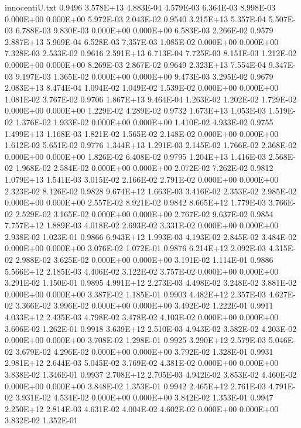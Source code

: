 \begin{filecontents}{innocentiU.txt}
0.9496 3.578E+13 4.883E-04 4.579E-03 6.364E-03 8.998E-03 0.000E+00 0.000E+00 5.972E-03 2.043E-02
0.9540 3.215E+13 5.357E-04 5.507E-03 6.788E-03 9.830E-03 0.000E+00 0.000E+00 6.583E-03 2.266E-02
0.9579 2.887E+13 5.969E-04 6.528E-03 7.357E-03 1.085E-02 0.000E+00 0.000E+00 7.328E-03 2.533E-02
0.9616 2.591E+13 6.713E-04 7.725E-03 8.151E-03 1.212E-02 0.000E+00 0.000E+00 8.269E-03 2.867E-02
0.9649 2.323E+13 7.554E-04 9.347E-03 9.197E-03 1.365E-02 0.000E+00 0.000E+00 9.473E-03 3.295E-02
0.9679 2.083E+13 8.474E-04 1.094E-02 1.049E-02 1.539E-02 0.000E+00 0.000E+00 1.081E-02 3.767E-02
0.9706 1.867E+13 9.464E-04 1.263E-02 1.202E-02 1.729E-02 0.000E+00 0.000E+00 1.229E-02 4.289E-02
0.9732 1.673E+13 1.053E-03 1.519E-02 1.376E-02 1.933E-02 0.000E+00 0.000E+00 1.410E-02 4.933E-02
0.9755 1.499E+13 1.168E-03 1.821E-02 1.565E-02 2.148E-02 0.000E+00 0.000E+00 1.612E-02 5.651E-02
0.9776 1.344E+13 1.291E-03 2.145E-02 1.766E-02 2.368E-02 0.000E+00 0.000E+00 1.826E-02 6.408E-02
0.9795 1.204E+13 1.416E-03 2.568E-02 1.968E-02 2.584E-02 0.000E+00 0.000E+00 2.072E-02 7.262E-02
0.9812 1.079E+13 1.541E-03 3.015E-02 2.166E-02 2.791E-02 0.000E+00 0.000E+00 2.323E-02 8.126E-02
0.9828 9.674E+12 1.663E-03 3.416E-02 2.353E-02 2.985E-02 0.000E+00 0.000E+00 2.557E-02 8.921E-02
0.9842 8.665E+12 1.779E-03 3.766E-02 2.529E-02 3.165E-02 0.000E+00 0.000E+00 2.767E-02 9.637E-02
0.9854 7.757E+12 1.889E-03 4.018E-02 2.693E-02 3.331E-02 0.000E+00 0.000E+00 2.938E-02 1.023E-01
0.9866 6.943E+12 1.993E-03 4.193E-02 2.845E-02 3.484E-02 0.000E+00 0.000E+00 3.076E-02 1.072E-01
0.9876 6.214E+12 2.092E-03 4.315E-02 2.988E-02 3.625E-02 0.000E+00 0.000E+00 3.191E-02 1.114E-01
0.9886 5.566E+12 2.185E-03 4.406E-02 3.122E-02 3.757E-02 0.000E+00 0.000E+00 3.291E-02 1.150E-01
0.9895 4.991E+12 2.273E-03 4.498E-02 3.248E-02 3.881E-02 0.000E+00 0.000E+00 3.387E-02 1.185E-01
0.9903 4.482E+12 2.357E-03 4.627E-02 3.366E-02 3.996E-02 0.000E+00 0.000E+00 3.492E-02 1.222E-01
0.9911 4.033E+12 2.435E-03 4.798E-02 3.478E-02 4.103E-02 0.000E+00 0.000E+00 3.606E-02 1.262E-01
0.9918 3.639E+12 2.510E-03 4.943E-02 3.582E-02 4.203E-02 0.000E+00 0.000E+00 3.708E-02 1.298E-01
0.9925 3.290E+12 2.579E-03 5.046E-02 3.679E-02 4.296E-02 0.000E+00 0.000E+00 3.792E-02 1.328E-01
0.9931 2.981E+12 2.644E-03 5.045E-02 3.769E-02 4.381E-02 0.000E+00 0.000E+00 3.838E-02 1.346E-01
0.9937 2.708E+12 2.705E-03 4.942E-02 3.853E-02 4.460E-02 0.000E+00 0.000E+00 3.848E-02 1.353E-01
0.9942 2.465E+12 2.761E-03 4.791E-02 3.931E-02 4.534E-02 0.000E+00 0.000E+00 3.842E-02 1.353E-01
0.9947 2.250E+12 2.814E-03 4.631E-02 4.004E-02 4.602E-02 0.000E+00 0.000E+00 3.832E-02 1.352E-01

\end{filecontents}
